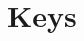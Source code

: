 \documentclass[11pt,a4paper,oneside]{book}
\newcommand{\Tab}[1]{}
\begin{document}
\appendix
\chapter{Keys}
\begin{table}[H]
\centering\small
\caption{Keys.}\label{tab:keys}
\Tab{keys}
\end{table}
\end{document}
